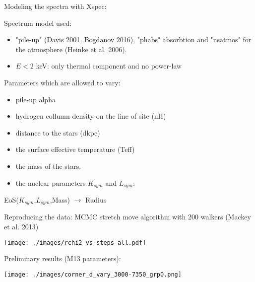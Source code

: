\documentclass[francais]{beamer}
\begin{document}
\begin{frame}{Modeling the spectra with Xspec:}
\begin{block}{Spectrum model used:}
\begin{itemize}
\item "pile-up" (Davis 2001, Bogdanov 2016), "phabs" absorbtion and "nsatmos" for the atmosphere  (Heinke et al. 2006).
\item $E<2$ keV: only thermal component and no power-law 
\end{itemize}
\end{block}
\begin{block}{Parameters which are allowed to vary:}
\begin{itemize}
\item pile-up alpha
\item hydrogen collumn density on the line of site (nH)
\item distance to the stars (dkpc)
\item the surface effective temperature (Teff)
\item the mass of the stars.
\item the nuclear parameters $K_{sym}$ and $L_{sym}$:
\end{itemize}
\centering
EoS($K_{sym}$,$L_{sym}$,Mass) $\rightarrow$ Radius
\end{block}
\end{frame}








\usebackgroundtemplate{}
\begin{frame}{Reproducing the data:}
MCMC stretch move algorithm with 200 walkers (Mackey et al. 2013)\\
\begin{center}
\texttt{[image: ./images/rchi2\_vs\_steps\_all.pdf]}
\end{center}
\end{frame}


\begin{frame}{Preliminary results (M13 parameters):}
\vspace{-0.5cm}
\begin{center}
\texttt{[image: ./images/corner\_d\_vary\_3000-7350\_grp0.png]}
\end{center}
\end{frame}
\end{document}
